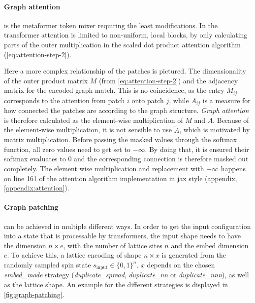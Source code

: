 \paragraph{Graph attention} is the metaformer token mixer requiring the least modifications.
In \cite{swinTransformerPaper} the transformer attention is limited to non-uniform, local blocks, by only calculating parts of the outer multiplication in the scaled dot product attention algorithm (\autoref{eq:attention-step-2}).

Here a more complex relationship of the patches is pictured. 
The dimensionality of the outer product matrix $M$ (from \autoref{eq:attention-step-2}) and the adjacency matrix for the encoded graph match.
This is no coincidence, as the entry $M_{ij}$ corresponds to the attention from patch $i$ onto patch $j$, while $A_{ij}$ is a measure for how \glqq connected\grqq{} the patches are according to the graph structure.
\emph{Graph attention} is therefore calculated as the element-wise multiplication of $M$ and $A$.
Because of the element-wise multiplication, it is not sensible to use $\tilde{A}$, which is motivated by matrix multiplication.
Before passing the masked values through the softmax function, all zero values need to get set to $-\infty$.
By doing that, it is ensured their softmax evaluates to 0 and the corresponding connection is therefore masked out completely.
The element wise multiplication and replacement with $-\infty$ happens on line 161 of the attention algorithm implementation in jax style (appendix, \ref{appendix:attention}).

\paragraph{Graph patching} can be achieved in multiple different ways.
In order to get the input configuration into a state that is processable by transformers, the input shape needs to have the dimension $n \times e$, with the number of lattice sites $n$ and the embed dimension $e$.
To achieve this, a lattice encoding of shape $n \times x$ is generated from the randomly sampled spin state $s_\mathrm{input} \in \{0,1\}^n$.
$x$ depends on the chosen \emph{embed\_mode} strategy (\emph{duplicate\_spread}, \emph{duplicate\_nn} or \emph{duplicate\_nnn}), as well as the lattice shape. 
An example for the different strategies is displayed in \autoref{fig:graph-patching}.


